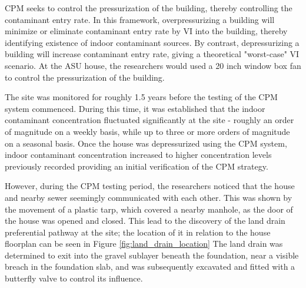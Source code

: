 CPM seeks to control the pressurization of the building, thereby controlling the contaminant entry rate.
In this framework, overpressurizing a building will minimize or eliminate contaminant entry rate by VI into the building, thereby identifying existence of indoor contaminant sources.
By contrast, depressurizing a building will increase contaminant entry rate, giving a theoretical "worst-case" VI scenario.
At the ASU house, the researchers would used a 20 inch window box fan to control the pressurization of the building.\par

The site was monitored for roughly 1.5 years before the testing of the CPM system commenced.
During this time, it was established that the indoor contaminant concentration fluctuated significantly at the site - roughly an order of magnitude on a weekly basis, while up to three or more orders of magnitude on a seasonal basis.
Once the house was depressurized using the CPM system, indoor contaminant concentration increased to higher concentration levels previously recorded providing an initial verification of the CPM strategy\cite{holton_long-term_2015}.\par

However, during the CPM testing period, the researchers noticed that the house and nearby sewer seemingly communicated with each other.
This was shown by the movement of a plastic tarp, which covered a nearby manhole, as the door of the house was opened and closed.
This lead to the discovery of the land drain preferential pathway at the site; the location of it in relation to the house floorplan can be seen in Figure \ref{fig:land_drain_location}
The land drain was determined to exit into the gravel sublayer beneath the foundation, near a visible breach in the foundation slab, and was subsequently excavated and fitted with a butterfly valve \cite{guo_identification_2015} to control its influence.\par

